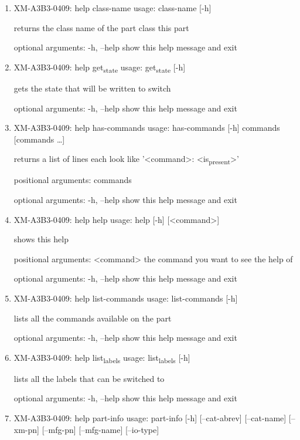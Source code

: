 \documentclass[11pt]{article}
\begin{document}
\begin{enumerate}
\item XM-A3B3-0409: help class-name
\label{sec:orgdc5eb04}
usage: class-name [-h]

returns the class name of the part class this part

optional arguments:
  -h, --help  show this help message and exit

\item XM-A3B3-0409: help get\textsubscript{state}
\label{sec:orgca63fac}
usage: get\textsubscript{state} [-h]

gets the state that will be written to switch

optional arguments:
  -h, --help  show this help message and exit

\item XM-A3B3-0409: help has-commands
\label{sec:orgdeb5492}
usage: has-commands [-h] commands [commands \ldots{}]

returns a list of lines each look like '<command>: <is\textsubscript{present}>'

positional arguments:
  commands

optional arguments:
  -h, --help  show this help message and exit

\item XM-A3B3-0409: help help
\label{sec:org033f57d}
usage: help [-h] [<command>]

shows this help

positional arguments:
  <command>   the command you want to see the help of

optional arguments:
  -h, --help  show this help message and exit

\item XM-A3B3-0409: help list-commands
\label{sec:orgb552305}
usage: list-commands [-h]

lists all the commands available on the part

optional arguments:
  -h, --help  show this help message and exit

\item XM-A3B3-0409: help list\textsubscript{labels}
\label{sec:org4abf177}
usage: list\textsubscript{labels} [-h]

lists all the labels that can be switched to

optional arguments:
  -h, --help  show this help message and exit

\item XM-A3B3-0409: help part-info
\label{sec:org5e2cd20}
usage: part-info  [-h] [--cat-abrev] [--cat-name] [--xm-pn] [--mfg-pn] [--mfg-name]
        [--io-type]


\end{enumerate}
\end{document}
